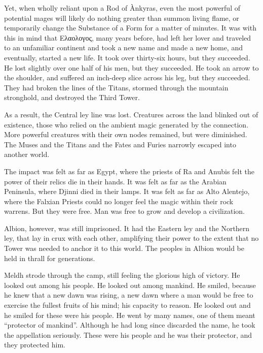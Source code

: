 Yet, when wholly reliant upon a Rod of Ànkyras, even the most powerful of potential mages will likely do nothing greater than summon living flame, or temporarily change the Substance of a Form for a matter of minutes. It was with this in mind that Ελαολογος, many years before, had left her lover and traveled to an unfamiliar continent and took a new name and made a new home, and eventually, started a new life.
\simpleline
{}
It took over thirty-six hours, but they succeeded. He lost slightly over one half of his men, but they succeeded. He took an arrow to the shoulder, and suffered an inch-deep slice across his leg, but they succeeded. They had broken the lines of the Titans, stormed through the mountain stronghold, and destroyed the Third Tower.

As a result, the Central ley line was lost. Creatures across the land blinked out of existence, those who relied on the ambient magic generated by the connection. More powerful creatures with their own nodes remained, but were diminished. The Muses and the Titans and the Fates and Furies narrowly escaped into another world.

The impact was felt as far as Egypt, where the priests of Ra and Anubis felt the power of their relics die in their hands. It was felt as far as the Arabian Peninsula, where Djinni died in their lamps. It was felt as far as Alto Alentejo, where the Falxian Priests could no longer feel the magic within their rock warrens. But they were free. Man was free to grow and develop a civilization.

Albion, however, was still imprisoned. It had the Eastern ley and the Northern ley, that lay in crux with each other, amplifying their power to the extent that no Tower was needed to anchor it to this world. The peoples in Albion would be held in thrall for generations.

Meldh strode through the camp, still feeling the glorious high of victory. He looked out among his people. He looked out among mankind. He smiled, because he knew that a new dawn was rising, a new dawn where a man would be free to exercise the fullest fruits of his mind; his capacity to reason. He looked out and he smiled for these were his people. He went by many names, one of them meant “protector of mankind”. Although he had long since discarded the name, he took the appellation seriously. These were his people and he was their protector, and they protected him.

